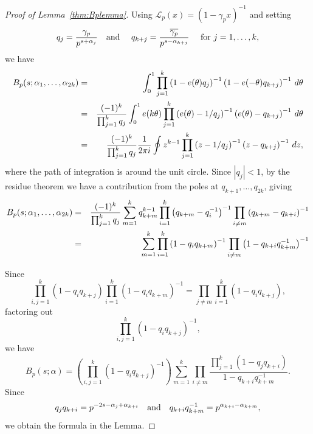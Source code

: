 \documentclass[12pt,letterpaper]{amsart}
\theoremstyle{plain}
\theoremstyle{definition}
\theoremstyle{remark}
\numberwithin{equation}{subsection}
\numberwithin{theorem}{subsection}
\numberwithin{table}{subsection}
\begin{document}
\begin{proof}[Proof of Lemma~\ref{thm:Bplemma}]  Using
$\mathcal{L}_p(x) = (1-\gamma_p x)^{-1}$
and setting 
\begin{equation}
 q_j = \frac{\gamma_p}{p^{s+\alpha_j}} \hbox{\ \ \  and \ \ \ }
 q_{k+j}=\frac{\overline{\gamma_p}}{p^{s -\alpha_{k+j}}} \hbox{ \ \ \ for } j=1,\ldots,k,
\end{equation}
we have
\begin{eqnarray} \label{eqn:arithint} 
B_p(s;\alpha_1,\dots,\alpha_{2k}) &=& \int_0^1 \prod_{j=1}^k
\left(1-e(\theta) q_j\right)^{-1}\left(1-e(-\theta) q_{k+j}\right)^{-1}
\,d\theta \cr
&  = & \frac{(-1)^k}{\prod_{j=1}^k  q_j}
\int_0^1 e(k\theta) \prod_{j=1}^k
\left(e(\theta)-1/ q_j\right)^{-1}
\left(e(\theta)- q_{k+j}\right)^{-1}
\,d\theta \cr
&  = & \frac{(-1)^k}{\prod_{j=1}^k  q_j} \frac{1}{2\pi i}
\oint z^{k-1} \prod_{j=1}^k
\left(z-1/ q_j\right)^{-1}
\left(z- q_{k+j}\right)^{-1}
\,dz ,
\end{eqnarray}
where the path of integration is around the unit circle.
Since $|q_j|<1$, by the residue theorem we have a contribution
from the poles at $q_{k+1},\dots,q_{2k}$, giving
\begin{eqnarray} 
B_p(s;\alpha_1,\dots,\alpha_{2k})&  = & \frac{(-1)^k}{\prod_{j=1}^k  q_j}
\sum_{m=1}^k q_{k+m}^{k-1}
 \prod_{i=1}^k
\left(q_{k+m}- q_i^{-1}\right)^{-1}
\prod_{i\not=m}\left(q_{k+m}- q_{k+i}\right)^{-1}
				 \cr
&  = & \sum_{m=1}^k 
 \prod_{i=1}^k
\left(1-q_i q_{k+m}\right)^{-1}
\prod_{i\not=m}\left(1- q_{k+i} q_{k+m}^{-1}\right)^{-1}
\end{eqnarray}

Since
\begin{equation}
\prod_{i,j=1}^k (1- q_i q_{k+j})
 \prod_{i=1}^k
\left(1-q_i q_{k+m}\right)^{-1}
=
\prod_{j\not=m}  \prod_{i=1}^k (1- q_i q_{k+j}),
\end{equation}
factoring out
\begin{equation}
\prod_{i,j=1}^k (1- q_i q_{k+j})^{-1},
\end{equation}
we have
\begin{equation}
B_p(s;\alpha)= \left(
    \prod_{i,j=1}^k (1- q_i q_{k+j})^{-1}
\right)
\sum_{m=1}^k
    \prod_{i\neq m} \frac{\prod_{j=1}^k ( 1- q_j q_{k+i})}
                         {1- q_{k+i} q_{k+m}^{-1}}.
\end{equation}
Since
\begin{equation}
q_j q_{k+i} = p^{-2s-\alpha_j+\alpha_{k+i}}
\hbox{\ \ \ and\ \ \ } 
q_{k+i} q_{k+m}^{-1} = p^{\alpha_{k+i}-\alpha_{k+m}}
,
\end{equation}
we obtain the formula in the Lemma.
\end{proof}
\end{document}
